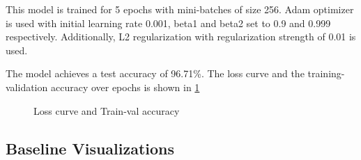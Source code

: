 \documentclass[10pt,twocolumn,letterpaper]{article}
\begin{document}
This model is trained for 5 epochs with mini-batches of size 256. Adam optimizer is used with initial learning rate 0.001, beta1 and beta2 set to 0.9 and 0.999 respectively. Additionally, L2 regularization with regularization strength of 0.01 is used.

The model achieves a test accuracy of 96.71\%. The loss curve and the training-validation accuracy over epochs is shown in \ref{fig:loss}

\begin{figure}%
	\centering
    
    \caption{Loss curve and Train-val accuracy}
	\label{fig:loss}
\end{figure}


\subsection{Baseline Visualizations}
\end{document}
